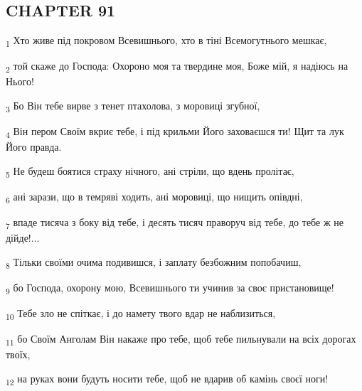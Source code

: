 \subsection{CHAPTER 91}
\begin{tcolorbox}
\textsubscript{1} Хто живе під покровом Всевишнього, хто в тіні Всемогутнього мешкає,
\end{tcolorbox}
\begin{tcolorbox}
\textsubscript{2} той скаже до Господа: Охороно моя та твердине моя, Боже мій, я надіюсь на Нього!
\end{tcolorbox}
\begin{tcolorbox}
\textsubscript{3} Бо Він тебе вирве з тенет птахолова, з моровиці згубної,
\end{tcolorbox}
\begin{tcolorbox}
\textsubscript{4} Він пером Своїм вкриє тебе, і під крильми Його заховаєшся ти! Щит та лук Його правда.
\end{tcolorbox}
\begin{tcolorbox}
\textsubscript{5} Не будеш боятися страху нічного, ані стріли, що вдень пролітає,
\end{tcolorbox}
\begin{tcolorbox}
\textsubscript{6} ані зарази, що в темряві ходить, ані моровиці, що нищить опівдні,
\end{tcolorbox}
\begin{tcolorbox}
\textsubscript{7} впаде тисяча з боку від тебе, і десять тисяч праворуч від тебе, до тебе ж не дійде!...
\end{tcolorbox}
\begin{tcolorbox}
\textsubscript{8} Тільки своїми очима подивишся, і заплату безбожним попобачиш,
\end{tcolorbox}
\begin{tcolorbox}
\textsubscript{9} бо Господа, охорону мою, Всевишнього ти учинив за своє пристановище!
\end{tcolorbox}
\begin{tcolorbox}
\textsubscript{10} Тебе зло не спіткає, і до намету твого вдар не наблизиться,
\end{tcolorbox}
\begin{tcolorbox}
\textsubscript{11} бо Своїм Анголам Він накаже про тебе, щоб тебе пильнували на всіх дорогах твоїх,
\end{tcolorbox}
\begin{tcolorbox}
\textsubscript{12} на руках вони будуть носити тебе, щоб не вдарив об камінь своєї ноги!
\end{tcolorbox}
